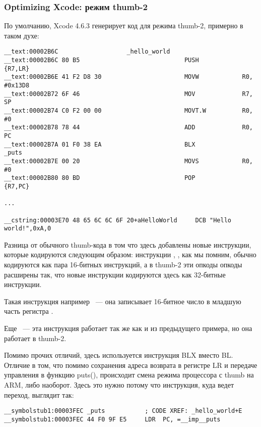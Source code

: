 \subsubsection{Optimizing Xcode: режим thumb-2}

По умолчанию, Xcode 4.6.3 генерирует код для режима thumb-2, примерно в таком духе:

\begin{lstlisting}
__text:00002B6C                   _hello_world
__text:00002B6C 80 B5                             PUSH            {R7,LR}
__text:00002B6E 41 F2 D8 30                       MOVW            R0, #0x13D8
__text:00002B72 6F 46                             MOV             R7, SP
__text:00002B74 C0 F2 00 00                       MOVT.W          R0, #0
__text:00002B78 78 44                             ADD             R0, PC
__text:00002B7A 01 F0 38 EA                       BLX             _puts
__text:00002B7E 00 20                             MOVS            R0, #0
__text:00002B80 80 BD                             POP             {R7,PC}

...

__cstring:00003E70 48 65 6C 6C 6F 20+aHelloWorld     DCB "Hello world!",0xA,0
\end{lstlisting}

Разница от обычного thumb-кода в том что здесь добавлены новые инструкции, которые кодируются следующим образом:
инструкции , , как мы помним, обычно кодируются как пара 16-битных инструкций, 
а в thumb-2 эти опкоды  опкоды расширены так, что новые инструкции кодируются здесь как 
32-битные инструкции.

Такая инструкция например  ~--- она записывает 16-битное число в 
младшую часть регистра .

Еще  ~--- эта инструкция работает так же как и  из предыдущего примера, 
но она работает в thumb-2.

Помимо прочих отличий, здесь используется инструкция BLX вместо BL. Отличие в том, что помимо сохранения адреса
возврата в регистре LR и передаче управления в функцию puts(), происходит смена режима процессора с thumb на ARM,
либо наоборот.
Здесь это нужно потому что инструкция, куда ведет переход, выглядит так:

\begin{lstlisting}
__symbolstub1:00003FEC _puts           ; CODE XREF: _hello_world+E
__symbolstub1:00003FEC 44 F0 9F E5     LDR  PC, =__imp__puts
\end{lstlisting}

